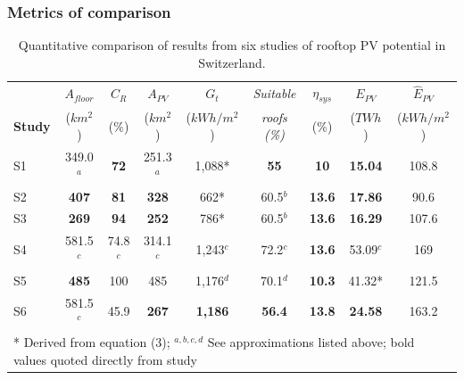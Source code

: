 \subsubsection{Metrics of comparison}

\begin{table}[htb]
\centering
\footnotesize
\caption{Quantitative comparison of results from six studies of rooftop PV potential in Switzerland.}
\label{tab:compare_values}
\begin{tabular}{lcccccccc}
     & $A_{floor}$       & $C_R$          & $A_{PV}$          & $G_t$             & \textit{Suitable}   & $\eta_{sys}$          & $E_{PV}$            & $\hat{E}_{PV}$       \\
\textbf{Study} & ($km^2$)        & (\%)        & ($km^2$)        & ($kWh/m^2$)       & \textit{roofs (\%)} & (\%)          & ($TWh$)          & ($kWh/m^2$) \\
S1             & 349.0$^a$   & \textbf{72} & 251.3$^a$       & 1,088*         & \textbf{55}         & \textbf{10}   & \textbf{15.04} & 108.8    \\
S2             & \textbf{407} & \textbf{81} & \textbf{328} & 662*           & 60.5$^b$               & \textbf{13.6} & \textbf{17.86} & 90.6     \\
S3             & \textbf{269} & \textbf{94} & \textbf{252} & 786*           & 60.5$^b$               & \textbf{13.6} & \textbf{16.29} & 107.6    \\
S4             & 581.5$^c$       & 74.8$^c$       & 314.1$^c$       & 1,243$^c$         & 72.2$^c$               & \textbf{13.6} & 53.09$^c$         & 169      \\
S5             & \textbf{485} & 100         & 485          & 1,176$^d$         & 70.1$^d$               & \textbf{10.3} & 41.32*         & 121.5    \\
S6             & 581.5$^c$       & 45.9        & \textbf{267} & \textbf{1,186} & \textbf{56.4}       & \textbf{13.8} & \textbf{24.58} & 163.2    \\
\multicolumn{9}{l}{* Derived from equation (3); $^{a,b,c,d}$ See approximations listed above; bold values quoted directly from study}             
\end{tabular}

\end{table}

